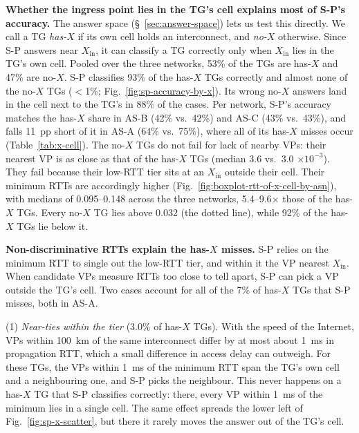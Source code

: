 \noindent \textbf{Whether the ingress point lies in the TG's cell explains most of S-P's accuracy.} The answer space (\S~\ref{sec:answer-space}) lets us test this directly. We call a TG \emph{has-$X$} if its own cell holds an interconnect, and \emph{no-$X$} otherwise. Since S-P answers near $X_{\mathrm{in}}$, it can classify a TG correctly only when $X_{\mathrm{in}}$ lies in the TG's own cell. Pooled over the three networks, 53\% of the TGs are has-$X$ and 47\% are no-$X$. S-P classifies 93\% of the has-$X$ TGs correctly and almost none of the no-$X$ TGs ($<$1\%; Fig.~\ref{fig:sp-accuracy-by-x}). Its wrong no-$X$ answers land in the cell next to the TG's in 88\% of the cases. Per network, S-P's accuracy matches the has-$X$ share in AS-B (42\% vs.\ 42\%) and AS-C (43\% vs.\ 43\%), and falls 11~pp short of it in AS-A (64\% vs.\ 75\%), where all of its has-$X$ misses occur (Table~\ref{tab:x-cell}). The no-$X$ TGs do not fail for lack of nearby VPs: their nearest VP is as close as that of the has-$X$ TGs (median 3.6 vs.\ 3.0 $\times 10^{-3}$). They fail because their low-RTT tier sits at an $X_{\mathrm{in}}$ outside their cell. Their minimum RTTs are accordingly higher (Fig.~\ref{fig:boxplot-rtt-of-x-cell-by-asn}), with medians of 0.095--0.148 across the three networks, 5.4--9.6$\times$ those of the has-$X$ TGs. Every no-$X$ TG lies above 0.032 (the dotted line), while 92\% of the has-$X$ TGs lie below it. 

\noindent \textbf{Non-discriminative RTTs explain the has-$X$ misses.} S-P relies on the minimum RTT to single out the low-RTT tier, and within it the VP nearest $X_{\mathrm{in}}$. When candidate VPs measure RTTs too close to tell apart, S-P can pick a VP outside the TG's cell. Two cases account for all of the 7\% of has-$X$ TGs that S-P misses, both in AS-A. 

(1) \emph{Near-ties within the tier} (3.0\% of has-$X$ TGs). With the speed of the Internet, VPs within 100~km of the same interconnect differ by at most about 1~ms in propagation RTT, which a small difference in access delay can outweigh. For these TGs, the VPs within 1~ms of the minimum RTT span the TG's own cell and a neighbouring one, and S-P picks the neighbour. This never happens on a has-$X$ TG that S-P classifies correctly: there, every VP within 1~ms of the minimum lies in a single cell. The same effect spreads the lower left of Fig.~\ref{fig:sp-x-scatter}, but there it rarely moves the answer out of the TG's cell. 

